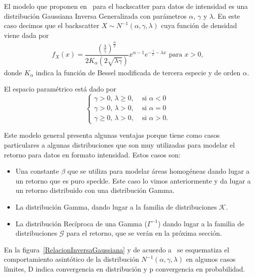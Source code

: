 El modelo que proponen en~\cite{Frery99} para el backscatter para datos de intensidad es una distribución Gaussiana Inversa Generalizada con parámetros $\alpha$, $\gamma$ y $\lambda$. En este caso decimos que el backscatter $X\sim N^{-1}(\alpha,\gamma,\lambda)$ cuya función de densidad viene dada por
\begin{align}
f_X(x) = \dfrac{\left(\frac{\lambda}{\gamma}\right)^{\frac{\alpha}{2}}}{2 K_{\alpha} (2 \sqrt{\lambda \gamma})} x^{\alpha-1} e^{-\frac{\gamma}{x}-\lambda x} \text{ para } x>0,
\label{ReciprocaGamma}
\end{align}
donde $K_{\alpha}$ indica la función de Bessel modificada de tercera especie y de orden $\alpha$. 

El espacio paramétrico está dado por
\[
\begin{cases}
\label{EspacioParametros}
	\gamma>0,      \,  \lambda \geq 0,  & \text{ si } \alpha < 0\\
	\gamma>0,      \,  \lambda >0,      & \text{ si } \alpha=0\\
	\gamma \geq 0, \,  \lambda >0,      & \text{ si } \alpha>0.
\end{cases}
\]

Este modelo general presenta algunas ventajas porque tiene como casos particulares a algunas distribuciones que son muy utilizadas para modelar el retorno para datos en formato intensidad. Estos casos son:

\begin{itemize}
	\item Una constante $\beta$ que se utiliza para modelar áreas homogéneas dando lugar a un retorno que es puro speckle. Este caso lo vimos anteriormente y da lugar a un retorno distribuido con una distribución Gamma.
	\item La distribución Gamma, dando lugar a la familia de distribuciones $\mathcal{K}$. 
	\item La distribución Recíproca de una Gamma ($\Gamma^{-1}$) dando lugar a la familia de distribuciones $\mathcal{G}$ para el retorno, que se verán en la próxima sección.
\end{itemize}

En la figura~\ref{RelacionInversaGaussiana} y de acuerdo a~\cite{Frery99} se esquematiza el comportamiento asintótico de la distribución $N^{-1}(\alpha,\gamma,\lambda)$ en algunos casos límites, D indica convergencia en distribución y p convergencia en probabilidad.

